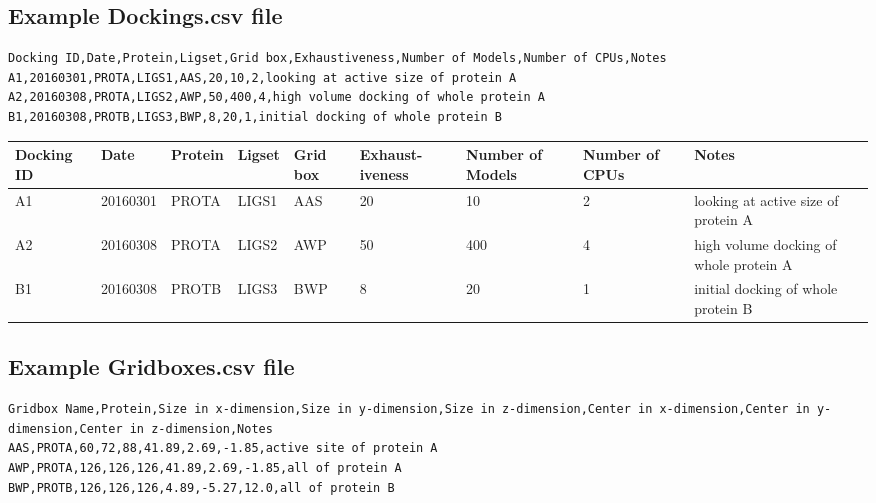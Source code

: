 \subsection{Example Dockings.csv file}

\begin{lstlisting}
Docking ID,Date,Protein,Ligset,Grid box,Exhaustiveness,Number of Models,Number of CPUs,Notes
A1,20160301,PROTA,LIGS1,AAS,20,10,2,looking at active size of protein A
A2,20160308,PROTA,LIGS2,AWP,50,400,4,high volume docking of whole protein A
B1,20160308,PROTB,LIGS3,BWP,8,20,1,initial docking of whole protein B
\end{lstlisting}

\begin{table}[h]\scriptsize
	\label{tab:dockings.csv}
		\begin{tabular}
		{|p{1.23cm}|l|l|l|p{.73cm}|p{1.37cm}|p{1.5cm}|p{1.28cm}|p{1.6cm}|}
			\hline
			\textbf{Docking ID} & \textbf{Date} & \textbf{Protein} & \textbf{Ligset} & \textbf{Grid box} & \textbf{Exhaust-iveness} & \textbf{Number of Models} & \textbf{Number of CPUs} & \textbf{Notes} \\
			\hline
			\hline
			A1 & 20160301 & PROTA & LIGS1 & AAS & 20 & 10 & 2 & looking at active size of protein A \\
			\hline
			A2 & 20160308 & PROTA & LIGS2 & AWP & 50 & 400 & 4 & high volume docking of whole protein A \\
			\hline
			B1 & 20160308 & PROTB & LIGS3 & BWP & 8 & 20 & 1 & initial docking of whole protein B \\
			\hline
		\end{tabular}
\end{table}


\subsection{Example Gridboxes.csv file}

\begin{lstlisting}
Gridbox Name,Protein,Size in x-dimension,Size in y-dimension,Size in z-dimension,Center in x-dimension,Center in y-dimension,Center in z-dimension,Notes
AAS,PROTA,60,72,88,41.89,2.69,-1.85,active site of protein A
AWP,PROTA,126,126,126,41.89,2.69,-1.85,all of protein A
BWP,PROTB,126,126,126,4.89,-5.27,12.0,all of protein B
\end{lstlisting}

